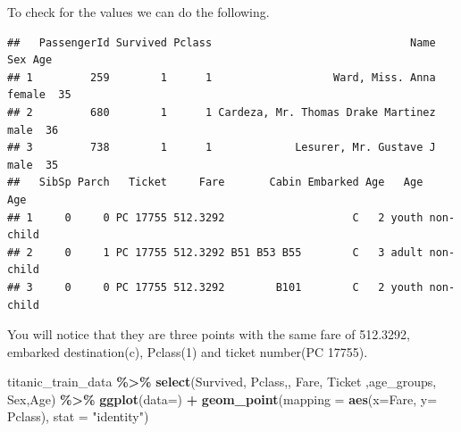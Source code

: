 \documentclass[
]{article}
\newenvironment{Shaded}{\begin{snugshade}}{\end{snugshade}}
\newcommand{\AttributeTok}[1]{\textcolor[rgb]{0.13,0.29,0.53}{#1}}
\newcommand{\DecValTok}[1]{\textcolor[rgb]{0.00,0.00,0.81}{#1}}
\newcommand{\FunctionTok}[1]{\textcolor[rgb]{0.13,0.29,0.53}{\textbf{#1}}}
\newcommand{\NormalTok}[1]{#1}
\newcommand{\SpecialCharTok}[1]{\textcolor[rgb]{0.81,0.36,0.00}{\textbf{#1}}}
\newcommand{\StringTok}[1]{\textcolor[rgb]{0.31,0.60,0.02}{#1}}
\begin{document}
To check for the values we can do the following.

\begin{Shaded}
\end{Shaded}

\begin{verbatim}
##   PassengerId Survived Pclass                               Name    Sex Age
## 1         259        1      1                   Ward, Miss. Anna female  35
## 2         680        1      1 Cardeza, Mr. Thomas Drake Martinez   male  36
## 3         738        1      1             Lesurer, Mr. Gustave J   male  35
##   SibSp Parch   Ticket     Fare       Cabin Embarked Age   Age       Age
## 1     0     0 PC 17755 512.3292                    C   2 youth non-child
## 2     0     1 PC 17755 512.3292 B51 B53 B55        C   3 adult non-child
## 3     0     0 PC 17755 512.3292        B101        C   2 youth non-child
\end{verbatim}

You will notice that they are three points with the same fare of
512.3292, embarked destination(c), Pclass(1) and ticket number(PC
17755).

\begin{Shaded}
\begin{Highlighting}[]
\NormalTok{titanic\_train\_data }\SpecialCharTok{\%\textgreater{}\%}
  \FunctionTok{select}\NormalTok{(Survived, Pclass,, Fare, Ticket ,age\_groups, Sex,Age) }\SpecialCharTok{\%\textgreater{}\%}
  \FunctionTok{ggplot}\NormalTok{(}\AttributeTok{data=}\NormalTok{) }\SpecialCharTok{+} 
  \FunctionTok{geom\_point}\NormalTok{(}\AttributeTok{mapping =}  \FunctionTok{aes}\NormalTok{(}\AttributeTok{x=}\NormalTok{Fare, }\AttributeTok{y=}\NormalTok{ Pclass), }\AttributeTok{stat =} \StringTok{"identity"}\NormalTok{)}
\end{Highlighting}
\end{Shaded}
\end{document}

